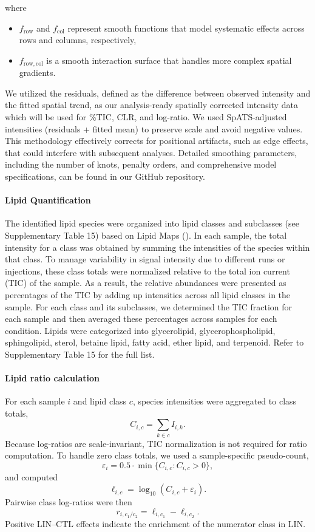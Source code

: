 \documentclass[9pt,twocolumn,twoside]{rilabRxiv}
\begin{document}
where 
\begin{itemize}
  \item \(f_{\mathrm{row}}\) and \(f_{\mathrm{col}}\) represent smooth functions that model systematic effects across rows and columns, respectively, 
  \item \(f_{\mathrm{row,col}}\) is a smooth interaction surface that handles more complex spatial gradients. 
\end{itemize}

We utilized the residuals, defined as the difference between observed intensity and the fitted spatial trend, as our analysis-ready spatially corrected intensity data which will be used for \%TIC, CLR, and log-ratio. We used SpATS-adjusted intensities (residuals + fitted mean) to preserve scale and avoid negative values. This methodology effectively corrects for positional artifacts, such as edge effects, that could interfere with subsequent analyses. Detailed smoothing parameters, including the number of knots, penalty orders, and comprehensive model specifications, can be found in our GitHub repository.

\paragraph{Lipid Quantification}
The identified lipid species were organized into lipid classes and subclasses (see Supplementary Table 15) based on Lipid Maps (\cite{Fahy2009LipidMapsClass}). In each sample, the total intensity for a class was obtained by summing the intensities of the species within that class. To manage variability in signal intensity due to different runs or injections, these class totals were normalized relative to the total ion current (TIC) of the sample. As a result, the relative abundances were presented as percentages of the TIC by adding up intensities across all lipid classes in the sample. For each class and its subclasses, we determined the TIC fraction for each sample and then averaged these percentages across samples for each condition. Lipids were categorized into glycerolipid, glycerophospholipid, sphingolipid, sterol, betaine lipid, fatty acid, ether lipid, and terpenoid. Refer to Supplementary Table 15 for the full list. 

\paragraph{Lipid ratio calculation}
For each sample $i$ and lipid class $c$, species intensities were aggregated to class totals,
\[
C_{i,c}=\sum_{k \in c} I_{i,k}.
\]
Because log-ratios are scale-invariant, TIC normalization is not required for ratio computation.
To handle zero class totals, we used a sample-specific pseudo-count,
\[
\varepsilon_i=0.5 \cdot \min\{C_{i,c} : C_{i,c}>0\},
\]
and computed
\[
\ell_{i,c}=\log_{10}(C_{i,c}+\varepsilon_i).
\]
Pairwise class log-ratios were then
\[
r_{i,c_1/c_2}=\ell_{i,c_1}-\ell_{i,c_2}.
\]
Positive LIN--CTL effects indicate the enrichment of the numerator class in LIN.
\end{document}
